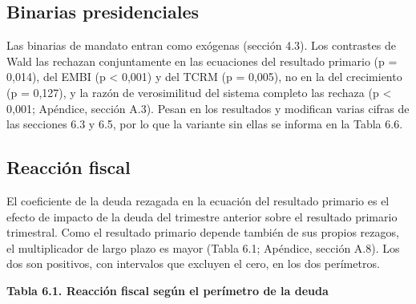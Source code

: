 \subsection{Binarias presidenciales}

Las binarias de mandato entran como exógenas (sección 4.3). Los
contrastes de Wald las rechazan conjuntamente en las ecuaciones del
resultado primario (p = 0,014), del EMBI (p \textless{} 0,001) y del
TCRM (p = 0,005), no en la del crecimiento (p = 0,127), y la razón de
verosimilitud del sistema completo las rechaza (p \textless{} 0,001;
Apéndice, sección A.3). Pesan en los resultados y modifican varias
cifras de las secciones 6.3 y 6.5, por lo que la variante sin ellas se
informa en la Tabla 6.6.

\subsection{Reacción fiscal}

El coeficiente de la deuda rezagada en la ecuación del resultado
primario es el efecto de impacto de la deuda del trimestre anterior
sobre el resultado primario trimestral. Como el resultado primario
depende también de sus propios rezagos, el multiplicador de largo plazo
es mayor (Tabla 6.1; Apéndice, sección A.8). Los dos son positivos, con
intervalos que excluyen el cero, en los dos perímetros.

\textbf{Tabla 6.1. Reacción fiscal según el perímetro de la deuda}

